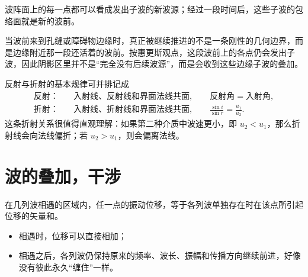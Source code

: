 \documentclass[lang=cn,11pt]{elegantbook}
\begin{document}
\begin{theorem}[惠更斯原理]
波阵面上的每一点都可以看成发出子波的新波源；经过一段时间后，这些子波的包络面就是新的波前。
\end{theorem}

 当波前来到孔缝或障碍物边缘时，真正被继续推进的不是一条刚性的几何边界，而是边缘附近那一段还活着的波前。按惠更斯观点，这段波前上的各点仍会发出子波，因此阴影区里并不是“完全没有后续波源”，而是会收到这些边缘子波的叠加。

\begin{theorem}[波的反射和折射]
反射与折射的基本规律可并排记成
\[
\begin{aligned}
\text{反射：}\quad &\text{入射线、反射线和界面法线共面},\qquad \text{反射角}=\text{入射角},\\
\text{折射：}\quad &\text{入射线、折射线和界面法线共面},\qquad \frac{\sin i}{\sin r}=\frac{u_1}{u_2}.
\end{aligned}
\]这条折射关系很值得直观理解：如果第二种介质中波速更小，即 \(u_2<u_1\)，那么折射线会向法线偏折；若 \(u_2>u_1\)，则会偏离法线。
\end{theorem}


\section{波的叠加，干涉}

\begin{definition}[波的叠加原理]
在几列波相遇的区域内，任一点的振动位移，等于各列波单独存在时在该点所引起位移的矢量和。
\begin{itemize}
 \item 相遇时，位移可以直接相加；
 \item 相遇之后，各列波仍保持原来的频率、波长、振幅和传播方向继续前进，好像没有彼此永久“缠住”一样。
\end{itemize}
\end{definition}
\end{document}

